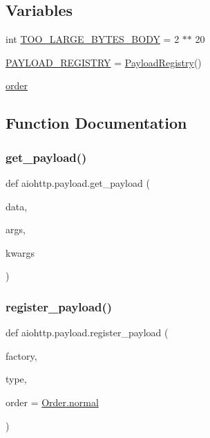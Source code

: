 \subsection*{Variables}
\begin{DoxyCompactItemize}
\item 
int \hyperlink{namespaceaiohttp_1_1payload_a157f1097ee1656f45842bd8df9cbe481}{T\+O\+O\+\_\+\+L\+A\+R\+G\+E\+\_\+\+B\+Y\+T\+E\+S\+\_\+\+B\+O\+DY} = 2 $\ast$$\ast$ 20
\item 
\hyperlink{namespaceaiohttp_1_1payload_a91bd43705fdb82008b00316da1ac7eb2}{P\+A\+Y\+L\+O\+A\+D\+\_\+\+R\+E\+G\+I\+S\+T\+RY} = \hyperlink{classaiohttp_1_1payload_1_1_payload_registry}{Payload\+Registry}()
\item 
\hyperlink{namespaceaiohttp_1_1payload_a0e481169b45d7b468717dd82dd2b3712}{order}
\end{DoxyCompactItemize}


\subsection{Function Documentation}
\mbox{\label{namespaceaiohttp_1_1payload_aaf2b9d72259fa164adccd57d1e85a929}} 
\subsubsection{\texorpdfstring{get\+\_\+payload()}{get\_payload()}}
{\footnotesize\ttfamily def aiohttp.\+payload.\+get\+\_\+payload (\begin{DoxyParamCaption}\item[{}]{data,  }\item[{}]{args,  }\item[{}]{kwargs }\end{DoxyParamCaption})}

\mbox{\label{namespaceaiohttp_1_1payload_a8e1cde3bc348f6270d7e5598c572b90d}} 
\subsubsection{\texorpdfstring{register\+\_\+payload()}{register\_payload()}}
{\footnotesize\ttfamily def aiohttp.\+payload.\+register\+\_\+payload (\begin{DoxyParamCaption}\item[{}]{factory,  }\item[{}]{type,  }\item[{}]{order = {\ttfamily \hyperlink{classaiohttp_1_1payload_1_1_order_a8f21d15654d7e3547ad88d35a907c921}{Order.\+normal}} }\end{DoxyParamCaption})}



